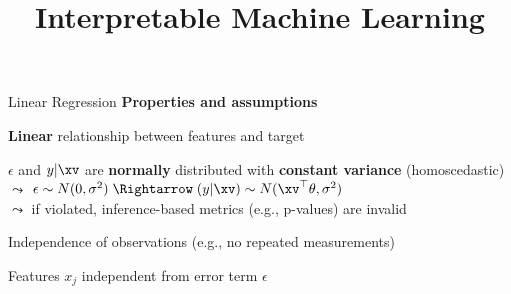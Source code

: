 \documentclass[10pt,compress,t,notes=noshow,xcolor=table]{beamer}
\title{Interpretable Machine Learning}
\begin{document}

\begin{framev}[align=top]{Linear Regression}
\spacer[0.25]
\pause
\textbf{Properties and assumptions}  %
\begin{itemizeM}
\item<+-> \textbf{Linear} relationship between features and target
\item<+-> $\epsilon$ and $y \vert \xv$ are \textbf{normally} distributed with \textbf{constant variance} (homoscedastic)\\
$\leadsto$ $\epsilon \sim N(0, \sigma^2) \; \Rightarrow \; (y \vert \xv) \sim N(\xv^\top \theta, \sigma^2)$\\
$\leadsto$ if violated, inference-based metrics (e.g., p-values) are invalid
\item<+-> Independence of observations (e.g., no repeated measurements) %
\item<+-> Features $x_j$ independent from error term $\epsilon$

\end{itemizeM}
\end{framev}
\end{document}
